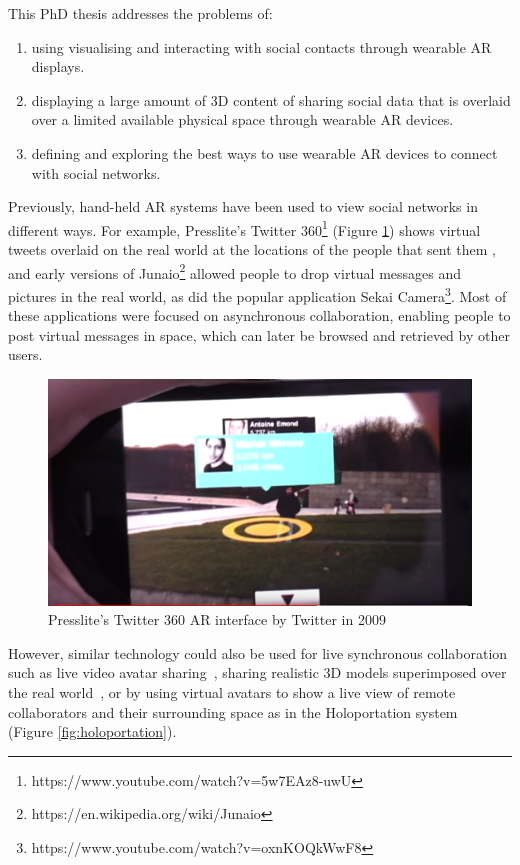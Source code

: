 This PhD thesis addresses the problems of: 
\begin{enumerate}
    \item using visualising and interacting with social contacts through wearable AR displays.
    \item displaying a large amount of 3D content of sharing social data that is overlaid over a limited available physical space through wearable AR devices.
    \item defining and exploring the best ways to use wearable AR devices to connect with social networks.
\end{enumerate}

Previously, hand-held AR systems have been used to view social networks in different ways. For example, Presslite's Twitter 360\footnote{https://www.youtube.com/watch?v=5w7EAz8-uwU} (Figure \ref{fig:presslite}) shows virtual tweets overlaid on the real world at the locations of the people that sent them , and early versions of Junaio\footnote{https://en.wikipedia.org/wiki/Junaio} allowed people to drop virtual messages and pictures in the real world, as did the popular application Sekai Camera\footnote{https://www.youtube.com/watch?v=oxnKOQkWwF8}. Most of these applications were focused on asynchronous collaboration, enabling people to post virtual messages in space, which can later be browsed and retrieved by other users. 

\begin{figure}
    \centering
    \includegraphics[width=0.8\linewidth]{images/10-intro/Presslite-twitter-360.PNG}
    \caption{Presslite's Twitter 360 AR interface by Twitter in 2009}
    \label{fig:presslite}
\end{figure}

However, similar technology could also be used for live synchronous collaboration such as live video avatar sharing~\cite{Billinghurst2002}, sharing realistic 3D models superimposed over the real world~\cite{Fanello2016}, or by using virtual avatars to show a live view of remote collaborators and their surrounding space as in the Holoportation system~\cite{Fanello2016} (Figure \ref{fig:holoportation}).

